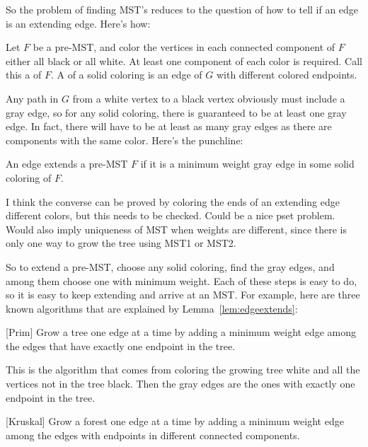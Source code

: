 So the problem of finding MST's reduces to the question of how to tell
if an edge is an extending edge.  Here's how:

\begin{definition}
Let $F$ be a pre-MST, and color the vertices in each connected
component of $F$ either all black or all white.  At least one
component of each color is required.  Call this a  of $F$.  A  of a
solid coloring is an edge of $G$ with different colored endpoints.
\end{definition}

Any path in $G$ from a white vertex to a black vertex obviously must
include a gray edge, so for any solid coloring, there is guaranteed to
be at least one gray edge.  In fact, there will have to be at least as
many gray edges as there are components with the same color.  Here's
the punchline:

\begin{lemma}\label{lem:edgeextends}
An edge extends a pre-MST $F$ if it is a minimum weight gray edge in
some solid coloring of $F$.
\end{lemma}

\begin{editingnotes}
I think the converse can be proved by coloring the ends of an
extending edge different colors, but this needs to be checked.  Could
be a nice pset problem.  Would also imply uniqueness of MST when
weights are different, since there is only one way to grow the tree
using MST1 or MST2.
\end{editingnotes}

So to extend a pre-MST, choose any solid coloring, find the gray
edges, and among them choose one with minimum weight.  Each of these
steps is easy to do, so it is easy to keep extending and arrive at an
MST.  For example, here are three known algorithms that are explained
by Lemma~\ref{lem:edgeextends}:

\begin{algorithm}\label{alg:MST1}[Prim]
  Grow a tree one edge at a time by adding a minimum weight edge
  among the edges that have exactly one endpoint in the tree.
\end{algorithm}

This is the algorithm that comes from coloring the growing tree white
and all the vertices not in the tree black.  Then the gray edges are
the ones with exactly one endpoint in the tree.

\begin{algorithm}\label{alg:MST2}[Kruskal]
  Grow a forest one edge at a time by adding a minimum weight edge
  among the edges with endpoints in different connected components.
\end{algorithm}

